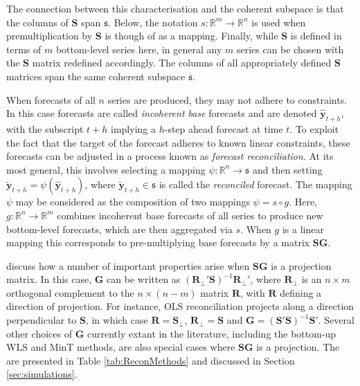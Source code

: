 \documentclass[12pt]{article}
\theoremstyle{definition}
\begin{document}
The connection between this characterisation and the coherent subspace is that the columns of $\bm{S}$ span $\mathfrak{s}$.  Below, the notation $s:\mathbb{R}^m\rightarrow\mathbb{R}^n$ is used when premultiplication by $\bm{S}$ is though of as a mapping.  Finally, while $\bm{S}$ is defined in terms of $m$ bottom-level series here, in general any $m$ series can be chosen with the $\bm{S}$ matrix redefined accordingly.  The columns of all appropriately defined $\bm{S}$ matrices span the same coherent subspace $\mathfrak{s}$.

When forecasts of all $n$ series are produced, they may not adhere to constraints.  In this case forecasts are called {\em incoherent base} forecasts and are denoted $\hat{\bm y}_{t+h}$, with the subscript $t+h$ implying a $h$-step ahead forecast at time $t$.  To exploit the fact that the target of the forecast adheres to known linear constraints, these forecasts can be adjusted in a process known as {\em forecast reconciliation}.  At its most general, this involves selecting a mapping $\psi:\mathbb{R}^n\rightarrow\mathfrak{s}$ and then setting $\tilde{\bm y}_{t+h}=\psi(\hat{\bm y}_{t+h})$, where $\tilde{\bm y}_{t+h}\in\mathfrak{s}$ is called the {\em reconciled} forecast.  The mapping $\psi$ may be considered as the composition of two mappings $\psi=s\circ g$. Here, $g:\mathbb{R}^{n}\rightarrow\mathbb{R}^{m}$ combines incoherent base forecasts of all series to produce new bottom-level forecasts, which are then aggregated via $s$.  When $g$ is a linear mapping this corresponds to pre-multiplying base forecasts by a matrix $\bm{S}\bm{G}$.

\cite{PanEtAl2019HF} discuss how a number of important properties arise when $\bm{S}\bm{G}$ is a projection matrix.  In this case, ${\bm G}$ can be written as $(\bm{R}_{\perp}'\bm{S})^{-1}\bm{R}_{\perp}'$, where $\bm{R}_{\perp}$ is an $n\times m$ orthogonal complement to the $n\times(n-m)$ matrix $\bm{R}$, with $\bm{R}$ defining a direction of projection.  For instance, OLS reconciliation \citep{HynEtAl2011} projects along a direction perpendicular to $\bm{S}$, in which case $\bm{R}=\bm{S}_{\perp}$, $\bm{R}_{\perp}=\bm{S}$ and $\bm{G}=(\bm{S}'\bm{S})^{-1}\bm{S}'$.  Several other choices of $\bm{G}$ currently extant in the literature, including the bottom-up \citep{Dunn1976} WLS \citep[][]{Hyndman2016,AthEtAl2017} and MinT \citep{WicEtAl2019} methods, are also special cases where $\bm{S}\bm{G}$ is a projection. The are presented in Table \ref{tab:ReconMethods} and discussed in Section \ref{sec:simulations}.
\end{document}
